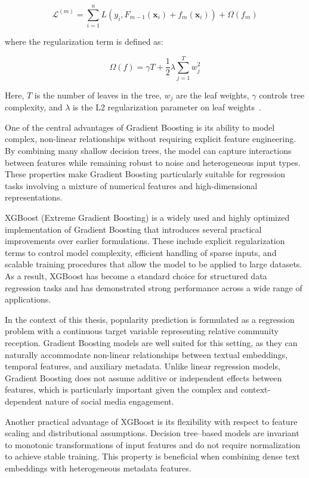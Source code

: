\begin{equation}
\mathcal{L}^{(m)} = \sum_{i=1}^{n} L(y_i, F_{m-1}(\mathbf{x}_i) + f_m(\mathbf{x}_i)) + \Omega(f_m)
\end{equation}

where the regularization term is defined as:

\begin{equation}
\Omega(f) = \gamma T + \frac{1}{2}\lambda \sum_{j=1}^{T} w_j^2
\end{equation}

Here, $T$ is the number of leaves in the tree, $w_j$ are the leaf weights, $\gamma$ controls tree complexity, and $\lambda$ is the L2 regularization parameter on leaf weights~\cite{chen2016xgboost}.

One of the central advantages of Gradient Boosting is its ability to model complex, non-linear relationships without requiring explicit feature engineering. By combining many shallow decision trees, the model can capture interactions between features while remaining robust to noise and heterogeneous input types. These properties make Gradient Boosting particularly suitable for regression tasks involving a mixture of numerical features and high-dimensional representations.

XGBoost (Extreme Gradient Boosting)\cite{chen2016xgboost} is a widely used and highly optimized implementation of Gradient Boosting that introduces several practical improvements over earlier formulations. These include explicit regularization terms to control model complexity, efficient handling of sparse inputs, and scalable training procedures that allow the model to be applied to large datasets. As a result, XGBoost has become a standard choice for structured data regression tasks and has demonstrated strong performance across a wide range of applications.

In the context of this thesis, popularity prediction is formulated as a regression problem with a continuous target variable representing relative community reception. Gradient Boosting models are well suited for this setting, as they can naturally accommodate non-linear relationships between textual embeddings, temporal features, and auxiliary metadata. Unlike linear regression models, Gradient Boosting does not assume additive or independent effects between features, which is particularly important given the complex and context-dependent nature of social media engagement.

Another practical advantage of XGBoost is its flexibility with respect to feature scaling and distributional assumptions. 
Decision tree–based models are invariant to monotonic transformations of input features and do not require normalization to achieve stable training. 
This property is beneficial when combining dense text embeddings with heterogeneous metadata features.


